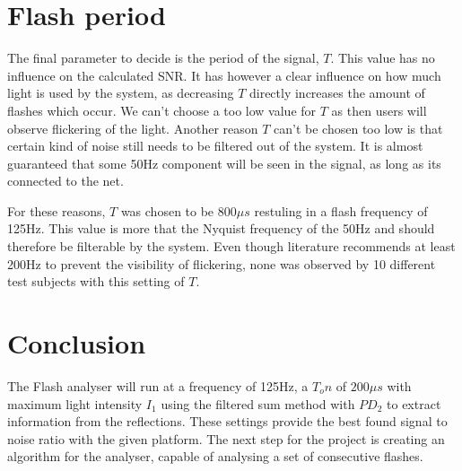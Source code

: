\section{Flash period}
The final parameter to decide is the period of the signal, $T$. This value has no influence on the calculated SNR. It has however a clear influence on how much light is used by the system, as decreasing $T$ directly increases the amount of flashes which occur. We can't choose a too low value for $T$ as then users will observe flickering of the light. Another reason $T$ can't be chosen too low is that certain kind of noise still needs to be filtered out of the system. It is almost guaranteed that some 50Hz component will be seen in the signal, as long as its connected to the net. 

For these reasons, $T$ was chosen to be 800$\mu s$ restuling in a flash frequency of 125Hz. This value is more that the Nyquist frequency of the 50Hz and should therefore be filterable by the system. Even though literature recommends at least 200Hz to prevent the visibility of flickering, none was observed by 10 different test subjects with this setting of $T$.

\section{Conclusion}
The Flash analyser will run at a frequency of 125Hz, a $T_on$ of $200\mu s$ with maximum light intensity $I_1$ using the filtered sum method with $PD_2$ to extract information from the reflections. These settings provide the best found signal to noise ratio with the given platform. The next step for the project is creating an algorithm for the analyser, capable of analysing a set of consecutive flashes.